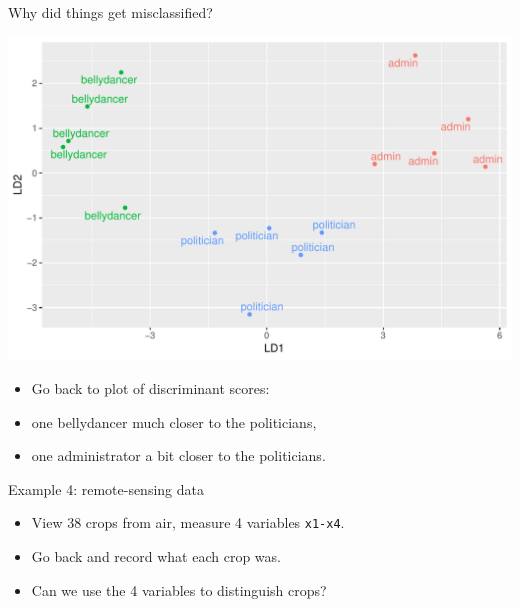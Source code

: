 \documentclass[unknownkeysallowed]{beamer}\usepackage[]{graphicx}\usepackage[]{color}
\makeatletter
\def\maxwidth{ %
  \ifdim\Gin@nat@width>\linewidth
    \linewidth
  \else
    \Gin@nat@width
  \fi
}
\newenvironment{knitrout}{}{} %
\makeatother
\begin{document}
\begin{frame}[fragile]{Why did things get misclassified?}

  \begin{minipage}[t]{0.7\linewidth}
\begin{knitrout}
\color{fgcolor}
\includegraphics[width=\maxwidth]{figure/nesta-1} 

\end{knitrout}
  \end{minipage}
  \begin{minipage}[t]{0.28\linewidth}
    \begin{itemize}
    \item Go back to plot of discriminant scores:
    \item one bellydancer much closer to the politicians,
    \item one administrator a bit closer to the politicians.
    \end{itemize}
  \end{minipage}
  
  

  
\end{frame}


\begin{frame}[fragile]{Example 4: remote-sensing data}

  \begin{itemize}
  \item View 38 crops from air, measure 4 variables \verb=x1-x4=.
  \item Go back and record what each crop was.
  \item Can we use the 4 variables to distinguish crops?
  \end{itemize}
\end{frame}
\end{document}
